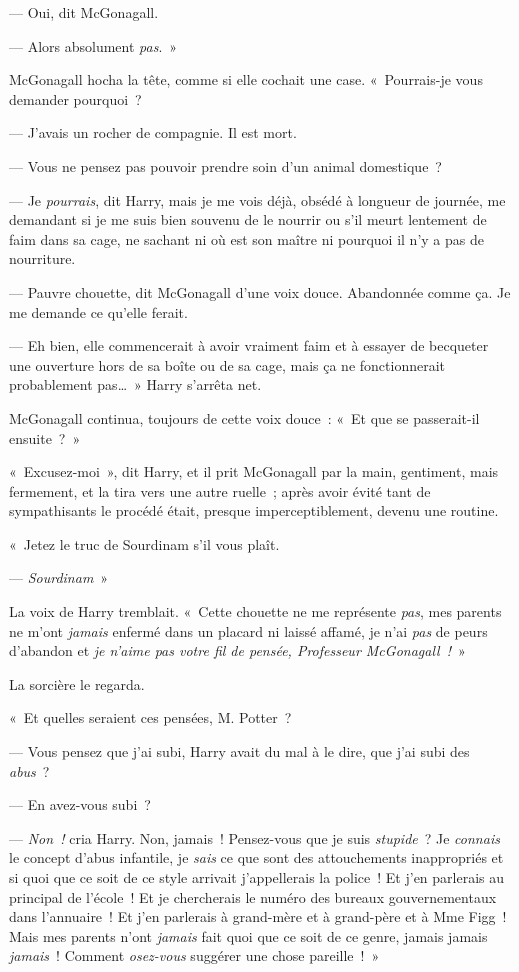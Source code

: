 --- Oui, dit McGonagall.

--- Alors absolument \emph{pas}.~»

McGonagall hocha la tête, comme si elle cochait une case.
«~Pourrais-je vous demander pourquoi~?

--- J'avais un rocher de compagnie. Il est mort.

--- Vous ne pensez pas pouvoir prendre soin d'un animal domestique~?

--- Je \emph{pourrais}, dit Harry, mais je me vois déjà, obsédé à longueur de journée, me demandant si je me suis bien souvenu de le nourrir ou s'il meurt lentement de faim dans sa cage, ne sachant ni où est son maître ni pourquoi il n'y a pas de nourriture.

--- Pauvre chouette, dit McGonagall d'une voix douce. Abandonnée comme ça. Je me demande ce qu'elle ferait.

--- Eh bien, elle commencerait à avoir vraiment faim et à essayer de becqueter une ouverture hors de sa boîte ou de sa cage, mais ça ne fonctionnerait probablement pas…~» Harry s'arrêta net.

McGonagall continua, toujours de cette voix douce~: «~Et que se passerait-il ensuite~?~»

«~Excusez-moi~», dit Harry, et il prit McGonagall par la main, gentiment, mais fermement, et la tira vers une autre ruelle~; après avoir évité tant de sympathisants le procédé était, presque imperceptiblement, devenu une routine.

«~Jetez le truc de Sourdinam s'il vous plaît.

--- \emph{Sourdinam}~»

La voix de Harry tremblait. «~Cette chouette ne me représente \emph{pas}, mes parents ne m'ont \emph{jamais} enfermé dans un placard ni laissé affamé, je n'ai \emph{pas} de peurs d'abandon et \emph{je n'aime pas votre fil de pensée, Professeur McGonagall~!}~»

La sorcière le regarda.

«~Et quelles seraient ces pensées, M. Potter~?

--- Vous pensez que j'ai subi, Harry avait du mal à le dire, que j'ai subi des \emph{abus}~?

--- En avez-vous subi~?

--- \emph{Non~!} cria Harry. Non, jamais~! Pensez-vous que je suis \emph{stupide}~? Je \emph{connais} le concept d'abus infantile, je \emph{sais} ce que sont des attouchements inappropriés et si quoi que ce soit de ce style arrivait j'appellerais la police~! Et j'en parlerais au principal de l'école~! Et je chercherais le numéro des bureaux gouvernementaux dans l'annuaire~! Et j'en parlerais à grand-mère et à grand-père et à Mme Figg~! Mais mes parents n'ont \emph{jamais} fait quoi que ce soit de ce genre, jamais jamais \emph{jamais}~! Comment \emph{osez-vous} suggérer une chose pareille~!~»

